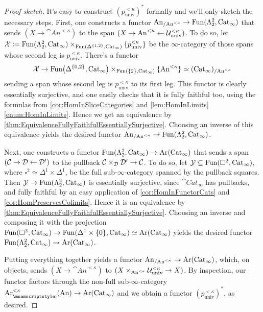 \begin{proof}[Proof sketch]
	It's easy to construct $(p_\mathrm{univ}^{<\kappa})^*$ formally and we'll only sketch the necessary steps. First, one constructs a functor $\mathrm{An}_{/\mathrm{An}^{<\kappa}}\rightarrow \operatorname{Fun}(\Lambda_2^2,\mathrm{Cat}_\infty)$ that sends $(X\rightarrow \cat{An}^{<\kappa})$ to the span $(X\rightarrow \mathrm{An}^{<\kappa}\leftarrow \mathcal{U}_\mathrm{univ}^{<\kappa})$. To do so, let $\mathcal{X}\coloneqq\operatorname{Fun}(\Lambda_2^2,\mathrm{Cat}_\infty)\times_{\operatorname{Fun}(\Delta^{\{1,2\}},\mathrm{Cat}_\infty)}\{p_\mathrm{univ}^{<\kappa}\}$ be the $\infty$-category of those spans whose second leg is $p_\mathrm{univ}^{<\kappa}$. There's a functor
	\begin{equation*}
		\mathcal{X}\rightarrow \operatorname{Fun}\bigl(\Delta^{\{0,2\}},\mathrm{Cat}_\infty\bigr)\times_{\operatorname{Fun}(\{2\},\mathrm{Cat}_\infty)}\{\mathrm{An}^{<\kappa}\}\simeq (\mathrm{Cat}_\infty)_{/\mathrm{An}^{<\kappa}}
	\end{equation*}
	sending a span whose second leg is $p_\mathrm{univ}^{<\kappa}$ to its first leg. This functor is clearly essentially surjective, and one easily checks that it is fully faithful too, using the formulas from \cref{cor:HomInSliceCategories} and \cref{lem:HomInLimits}\cref{enum:HomInLimits}. Hence we get an equivalence by \cref{thm:EquivalenceFullyFaithfulEssentiallySurjective}. Choosing an inverse of this equivalence yields the desired functor $\mathrm{An}_{/\mathrm{An}^{<\kappa}}\rightarrow \operatorname{Fun}(\Lambda_2^2,\mathrm{Cat}_\infty)$.
	
	Next, one constructs a functor $\operatorname{Fun}(\Lambda_2^2,\mathrm{Cat}_\infty)\rightarrow \operatorname{Ar}(\mathrm{Cat}_\infty)$ that sends a span $(\mathcal{C}\rightarrow {\mathcal{D}}\leftarrow \mathcal{D}')$ to the pullback $\mathcal{C}\times_{\mathcal{D}}\mathcal{D}'\rightarrow \mathcal{C}$. To do so, let $\mathcal{Y}\subseteq \operatorname{Fun}(\square^2,\mathrm{Cat}_\infty)$, where $\square^2\simeq \Delta^1\times\Delta^1$, be the full sub-$\infty$-category spanned by the pullback squares. Then $\mathcal{Y}\rightarrow \operatorname{Fun}(\Lambda_2^2,\mathrm{Cat}_\infty)$ is essentially surjective, since $\cat{Cat}_\infty$ has pullbacks, and fully faithful by an easy application of \cref{cor:HomInFunctorCats} and \cref{cor:HomPreservesColimits}. Hence it is an equivalence by \cref{thm:EquivalenceFullyFaithfulEssentiallySurjective}. Choosing an inverse and composing it with the projection $\operatorname{Fun}(\square^2,\mathrm{Cat}_\infty)\rightarrow \operatorname{Fun}(\Delta^1\times\{0\},\mathrm{Cat}_\infty)\simeq \operatorname{Ar}(\mathrm{Cat}_\infty)$ yields the desired functor $\operatorname{Fun}(\Lambda_2^2,\mathrm{Cat}_\infty)\rightarrow \operatorname{Ar}(\mathrm{Cat}_\infty)$.
	
	Putting everything together yields a functor $\mathrm{An}_{/\mathrm{An}^{<\kappa}}\rightarrow \operatorname{Ar}(\mathrm{Cat}_\infty)$, which, on objects, sends $(X\rightarrow \cat{An}^{<\kappa})$ to $(X\times_{\mathrm{An}^{<\kappa}}\mathcal{U}_\mathrm{univ}^{<\kappa}\rightarrow X)$. By inspection, our functor factors through the non-full sub-$\infty$-category $\Ar_{\pullbacksign \vphantom{^t}}^{<\kappa}(\cat{An})\rightarrow \Ar(\cat{Cat}_\infty)$ and we obtain a functor $(p_\mathrm{univ}^{<\kappa})^*$, as desired.
	

\end{proof}

